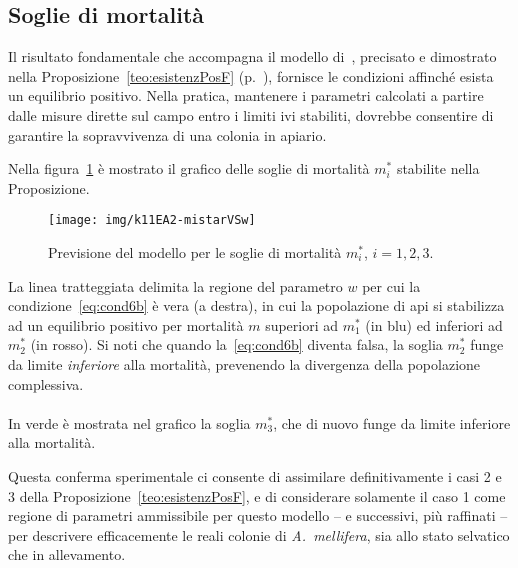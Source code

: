 \subsection{Soglie di mortalità}
Il risultato fondamentale che accompagna il modello di~\citeauthor{khoury2011}, precisato e dimostrato nella
Proposizione~\ref{teo:esistenzPosF} (p.~\pageref{teo:esistenzPosF}), fornisce le condizioni affinché esista un
equilibrio positivo. Nella pratica, mantenere i parametri calcolati a partire dalle misure dirette sul campo
entro i limiti ivi stabiliti, dovrebbe consentire di garantire la sopravvivenza di una colonia in apiario.

Nella figura~\ref{img:kh11expA24} è mostrato il grafico delle soglie di mortalità $m_i^*$ stabilite nella Proposizione.
\begin{figure}[hbt]
    \centering
    \texttt{[image: img/k11EA2-mistarVSw]}

    \caption[Esperimento A2, soglie di mortalità]{Previsione del modello per le soglie di mortalità $m_i^*$, $i=1,2,3$.}

    \label{img:kh11expA24}
\end{figure}

La linea tratteggiata delimita la regione del parametro $w$ per cui la condizione~\eqref{eq:cond6b} è vera (a destra),
in cui la popolazione di api si stabilizza ad un equilibrio positivo per mortalità $m$ superiori ad $m_1^*$ (in blu)
ed inferiori ad $m_2^*$ (in rosso). Si noti che quando la~\eqref{eq:cond6b} diventa falsa, la soglia $m_2^*$ funge
da limite \emph{inferiore} alla mortalità, prevenendo la divergenza della popolazione complessiva.

\paragraph{}
In verde è mostrata nel grafico la soglia $m_3^*$, che di nuovo funge da limite inferiore alla mortalità.

Questa conferma sperimentale ci consente di assimilare definitivamente i casi 2 e 3 della
Proposizione~\ref{teo:esistenzPosF}, e di considerare solamente il caso 1 come regione di parametri ammissibile
per questo modello -- e successivi, più raffinati -- per descrivere efficacemente le reali colonie di \emph{A.~mellifera},
sia allo stato selvatico che in allevamento.
